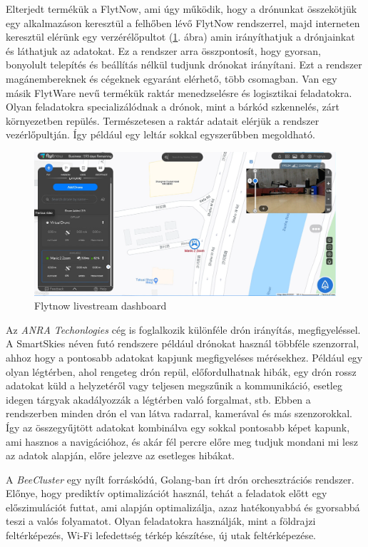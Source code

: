 Elterjedt termékük a FlytNow, ami úgy működik, hogy a drónunkat összekötjük egy alkalmazáson keresztül a felhőben lévő FlytNow rendszerrel,
majd interneten keresztül elérünk egy verzérélőpultot (\ref{fig:flytdash}. ábra) amin irányíthatjuk a drónjainkat és láthatjuk az adatokat.
Ez a rendszer arra összpontosít, hogy gyorsan, bonyolult telepítés és beállítás nélkül tudjunk drónokat irányítani.
Ezt a rendszer magánembereknek és cégeknek egyaránt elérhető, több csomagban.
Van egy másik FlytWare nevű termékük raktár menedzselésre és logisztikai feladatokra.
Olyan feladatokra specializálódnak a drónok, mint a bárkód szkennelés, zárt környezetben repülés.
Természetesen a raktár adatait elérjük a rendszer vezérlőpultján.
Így például egy leltár sokkal egyszerűbben megoldható.


\begin{figure}[h]
    \centering
    \includegraphics[scale=0.3]{images/flyt-dashboard.png}
    \caption{Flytnow livestream dashboard \cite{flytnow_2020}}
    \label{fig:flytdash}
\end{figure}

Az \textit{ANRA Techonlogies}\cite{anra-technologies-2020} cég is foglalkozik különféle drón irányítás, megfigyeléssel.
A SmartSkies néven futó rendszere például drónokat használ többféle szenzorral, ahhoz hogy a pontosabb adatokat kapjunk megfigyeléses mérésekhez.
Például egy olyan légtérben, ahol rengeteg drón repül, előfordulhatnak hibák, egy drón rossz adatokat küld a helyzetéről vagy teljesen megszűnik a kommunikáció, esetleg idegen tárgyak akadályozzák a légtérben  való forgalmat, stb.
Ebben a rendszerben minden drón el van látva radarral, kamerával és más szenzorokkal.
Így az összegyűjtött adatokat kombinálva egy sokkal pontosabb képet kapunk, ami hasznos a navigációhoz, és akár fél percre előre meg tudjuk mondani mi lesz az adatok alapján, előre jelezve az esetleges hibákat.


A \textit{BeeCluster}\cite{beecluster} egy nyílt forráskódú, Golang-ban írt drón orchesztrációs rendszer.
Előnye, hogy prediktív optimalizációt használ, tehát a feladatok előtt egy előszimulációt futtat, ami alapján optimalizálja, azaz hatékonyabbá és gyorsabbá teszi a valós folyamatot.
Olyan feladatokra használják, mint a földrajzi feltérképezés, Wi-Fi lefedettség térkép készítése, új utak feltérképezése.


